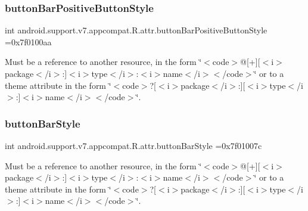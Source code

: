 \subsubsection{\texorpdfstring{button\+Bar\+Positive\+Button\+Style}{buttonBarPositiveButtonStyle}}
{\footnotesize\ttfamily int android.\+support.\+v7.\+appcompat.\+R.\+attr.\+button\+Bar\+Positive\+Button\+Style =0x7f0100aa\hspace{0.3cm}{\ttfamily [static]}}

Must be a reference to another resource, in the form \char`\"{}$<$code$>$@\mbox{[}+\mbox{]}\mbox{[}$<$i$>$package$<$/i$>$\+:\mbox{]}$<$i$>$type$<$/i$>$\+:$<$i$>$name$<$/i$>$$<$/code$>$\char`\"{} or to a theme attribute in the form \char`\"{}$<$code$>$?\mbox{[}$<$i$>$package$<$/i$>$\+:\mbox{]}\mbox{[}$<$i$>$type$<$/i$>$\+:\mbox{]}$<$i$>$name$<$/i$>$$<$/code$>$\char`\"{}. \mbox{\label{classandroid_1_1support_1_1v7_1_1appcompat_1_1R_1_1attr_a6910f254c6c12670fb4650919c7e0b67}} 
\subsubsection{\texorpdfstring{button\+Bar\+Style}{buttonBarStyle}}
{\footnotesize\ttfamily int android.\+support.\+v7.\+appcompat.\+R.\+attr.\+button\+Bar\+Style =0x7f01007c\hspace{0.3cm}{\ttfamily [static]}}

Must be a reference to another resource, in the form \char`\"{}$<$code$>$@\mbox{[}+\mbox{]}\mbox{[}$<$i$>$package$<$/i$>$\+:\mbox{]}$<$i$>$type$<$/i$>$\+:$<$i$>$name$<$/i$>$$<$/code$>$\char`\"{} or to a theme attribute in the form \char`\"{}$<$code$>$?\mbox{[}$<$i$>$package$<$/i$>$\+:\mbox{]}\mbox{[}$<$i$>$type$<$/i$>$\+:\mbox{]}$<$i$>$name$<$/i$>$$<$/code$>$\char`\"{}. \mbox{\label{classandroid_1_1support_1_1v7_1_1appcompat_1_1R_1_1attr_adf77db2087554bf02805ea33fde73d79}} 
